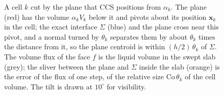 \begin{figure}[htbp]
\begin{tikzpicture}[scale=1.55, >=Stealth, font=\small]
\end{tikzpicture}
\caption{A cell $k$ cut by the plane that CCS positions from $\alpha_k$. The plane (red) has the volume $\alpha_k V_k$ below it and pivots about its position $\mathbf{x}_k$ in the cell; the exact interface $\Sigma$ (blue) and the plane cross near this pivot, and a normal turned by $\theta_k$ separates them by about $\theta_k$ times the distance from it, so the plane centroid is within $(h/2)\,\theta_k$ of $\Sigma$. The volume flux of the face $f$ is the liquid volume in the swept slab (grey); the sliver between the plane and $\Sigma$ inside the slab (orange) is the error of the flux of one step, of the relative size $\mathrm{Co}\,\theta_k$ of the cell volume. The tilt is drawn at $10^\circ$ for visibility.}
\label{fig:tilt}
\end{figure}
